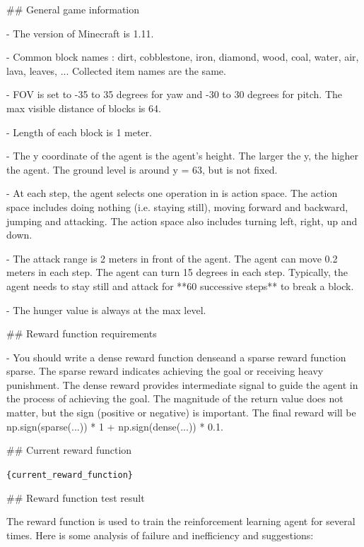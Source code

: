 \#\# General game information

- The version of Minecraft is 1.11.

- Common block names : dirt, cobblestone, iron, diamond, wood, coal, water, air, lava, leaves, ... Collected item names are the same.

- FOV is set to -35 to 35 degrees for yaw and -30 to 30 degrees for pitch. The max visible distance of blocks is 64.

- Length of each block is 1 meter.

- The y coordinate of the agent is the agent's height. The larger the y, the higher the agent. The ground level is around y = 63, but is not fixed.

- At each step, the agent selects one operation in is action space. The action space includes doing nothing (i.e. staying still), moving forward and backward, jumping and attacking. The action space also includes turning left, right, up and down. 

- The attack range is 2 meters in front of the agent. The agent can move 0.2 meters in each step. The agent can turn 15 degrees in each step. Typically, the agent needs to stay still and attack for **60 successive steps** to break a block.

- The hunger value is always at the max level.





\#\# Reward function requirements

- You should write a dense reward function \textasciigrave dense\textasciigrave  and a sparse reward function \textasciigrave sparse\textasciigrave . The sparse reward indicates achieving the goal or receiving heavy punishment. The dense reward provides intermediate signal to guide the agent in the process of achieving the goal. The magnitude of the return value does not matter, but the sign (positive or negative) is important. The final reward will be \textasciigrave np.sign(sparse(...)) * 1 + np.sign(dense(...)) * 0.1\textasciigrave .





\#\# Current reward function

\texttt{\{current\_reward\_function\}}



\#\# Reward function test result

The reward function is used to train the reinforcement learning agent for several times. Here is some analysis of failure and inefficiency and suggestions:


